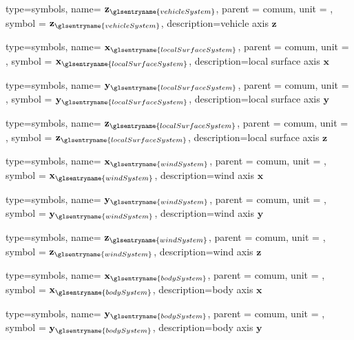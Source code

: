 {type=symbols,
name= \ensuremath{\mathbf{z}_{\glsentryname{vehicleSystem}}},
parent = {comum},
unit = \unexpanded{},
symbol = \ensuremath{\mathbf{z}_{\glsentryname{vehicleSystem}}},
description={vehicle axis $\mathbf{z}$}
}




{type=symbols,
name= \ensuremath{\mathbf{x}_{\glsentryname{localSurfaceSystem}}},
parent = {comum},
unit = \unexpanded{},
symbol = \ensuremath{\mathbf{x}_{\glsentryname{localSurfaceSystem}}},
description={local surface axis $\mathbf{x}$}
}

{type=symbols,
name= \ensuremath{\mathbf{y}_{\glsentryname{localSurfaceSystem}}},
parent = {comum},
unit = \unexpanded{},
symbol = \ensuremath{\mathbf{y}_{\glsentryname{localSurfaceSystem}}},
description={local surface axis $\mathbf{y}$}
}



{type=symbols,
name= \ensuremath{\mathbf{z}_{\glsentryname{localSurfaceSystem}}},
parent = {comum},
unit = \unexpanded{},
symbol = \ensuremath{\mathbf{z}_{\glsentryname{localSurfaceSystem}}},
description={local surface axis $\mathbf{z}$}
}


{type=symbols,
name= \ensuremath{\mathbf{x}_{\glsentryname{windSystem}}},
parent = {comum},
unit = \unexpanded{},
symbol = \ensuremath{\mathbf{x}_{\glsentryname{windSystem}}},
description={wind axis $\mathbf{x}$}
}

{type=symbols,
name= \ensuremath{\mathbf{y}_{\glsentryname{windSystem}}},
parent = {comum},
unit = \unexpanded{},
symbol = \ensuremath{\mathbf{y}_{\glsentryname{windSystem}}},
description={wind axis $\mathbf{y}$}
}



{type=symbols,
name= \ensuremath{\mathbf{z}_{\glsentryname{windSystem}}},
parent = {comum},
unit = \unexpanded{},
symbol = \ensuremath{\mathbf{z}_{\glsentryname{windSystem}}},
description={wind axis $\mathbf{z}$}
}


{type=symbols,
name= \ensuremath{\mathbf{x}_{\glsentryname{bodySystem}}},
parent = {comum},
unit = \unexpanded{},
symbol = \ensuremath{\mathbf{x}_{\glsentryname{bodySystem}}},
description={body axis $\mathbf{x}$}
}

{type=symbols,
name= \ensuremath{\mathbf{y}_{\glsentryname{bodySystem}}},
parent = {comum},
unit = \unexpanded{},
symbol = \ensuremath{\mathbf{y}_{\glsentryname{bodySystem}}},
description={body axis $\mathbf{y}$}
}

